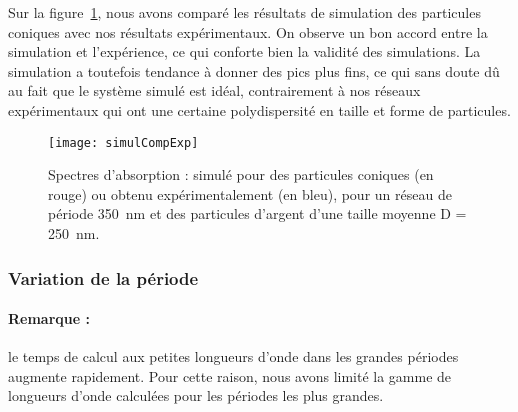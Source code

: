 Sur la figure~\ref{simulCompForme}, nous avons comparé les résultats de simulation des particules coniques avec nos résultats expérimentaux. On observe un bon accord entre la simulation et l'expérience, ce qui conforte bien la validité des simulations. La simulation a toutefois tendance à donner des pics plus fins, ce qui sans doute dû au fait que le système simulé est idéal, contrairement à nos réseaux expérimentaux qui ont une certaine polydispersité en taille et forme de particules.\par 
\begin{figure}[!htb]
\centering
\texttt{[image: simulCompExp]}
\caption{Spectres d'absorption : simulé pour des particules coniques (en rouge) ou obtenu expérimentalement (en bleu), pour un réseau de période 350~nm et des particules d'argent d'une taille moyenne D = 250~nm.}
\label{simulCompForme}
\end{figure}
	\subsubsection{Variation de la période}
\paragraph*{Remarque :} le temps de calcul aux petites longueurs d'onde dans les grandes périodes augmente rapidement. Pour cette raison, nous avons limité la gamme de longueurs d'onde calculées pour les périodes les plus grandes.\par \vspace{12pt}

